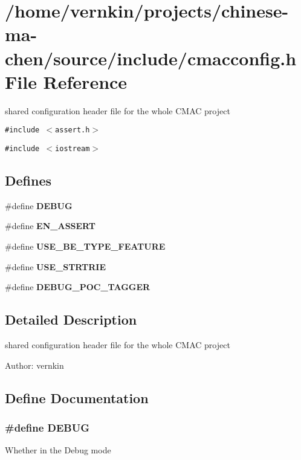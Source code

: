 \section{/home/vernkin/projects/chinese-ma-chen/source/include/cmacconfig.h File Reference}
\label{cmacconfig_8h}
shared configuration header file for the whole CMAC project  


{\tt \#include $<$assert.h$>$}\par
{\tt \#include $<$iostream$>$}\par
\subsection*{Defines}
\begin{CompactItemize}
\item 
\#define {\bf DEBUG}
\item 
\#define {\bf EN\_\-ASSERT}
\item 
\#define {\bf USE\_\-BE\_\-TYPE\_\-FEATURE}
\item 
\#define {\bf USE\_\-STRTRIE}
\item 
\#define {\bf DEBUG\_\-POC\_\-TAGGER}
\end{CompactItemize}


\subsection{Detailed Description}
shared configuration header file for the whole CMAC project 

\begin{Desc}
\item[Author:]vernkin \end{Desc}


\subsection{Define Documentation}
\subsubsection[{DEBUG}]{\setlength{\rightskip}{0pt plus 5cm}\#define DEBUG}\label{cmacconfig_8h_d72dbcf6d0153db1b8d8a58001feed83}


Whether in the Debug mode 
